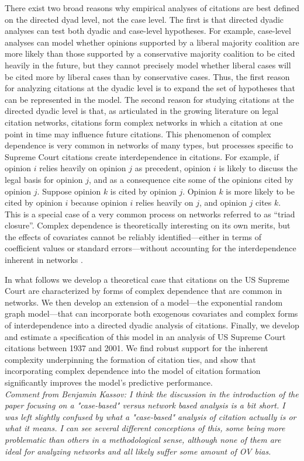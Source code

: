 \documentclass[headsepline=true, abstracton]{scrartcl}
\begin{document}
There exist two broad reasons why empirical analyses of citations are best defined on the directed dyad level, not the case level. The first is that directed dyadic analyses can test both dyadic and case-level hypotheses. For example, case-level analyses can model whether opinions supported by a liberal majority coalition are more likely than those supported by a conservative majority coalition to be cited heavily in the future, but they cannot precisely model whether liberal cases will be cited more by liberal cases than by conservative cases. Thus, the first reason for analyzing citations at the dyadic level is to expand the set of hypotheses that can be represented in the model. The second reason for studying citations at the directed dyadic level is that, as articulated in the growing literature on legal citation networks, citations form complex networks in which a citation at one point in time may influence future citations. This phenomenon of complex dependence is very common in networks of many types, but processes specific to Supreme Court citations create interdependence in citations. For example, if opinion $i$ relies heavily on opinion $j$ as precedent, opinion $i$ is likely to discuss the legal basis for opinion $j$, and as a consequence cite some of the opinions cited by opinion $j$. Suppose opinion $k$ is cited by opinion $j$. Opinion $k$ is more likely to be cited by opinion $i$ because opinion $i$ relies heavily on $j$, and opinion $j$ cites $k$.  This is a special case of a very common process on networks referred to as ``triad closure''. Complex dependence is theoretically interesting on its own merits, but the effects of covariates cannot be reliably identified---either in terms of coefficient values or standard errors---without accounting for the interdependence inherent in networks \citep{desmaraisstatistical}. 

In what follows we develop a theoretical case that citations on the US Supreme Court are characterized by forms of complex dependence that are common in networks. We then develop an extension of a model---the exponential random graph model---that can incorporate both exogenous covariates and complex forms of interdependence into a directed dyadic analysis of citations. Finally, we develop and estimate a specification of this model in an analysis of US Supreme Court citations between 1937 and 2001. We find robust support for the inherent complexity underpinning the formation of citation ties, and show that incorporating complex dependence into the model of citation formation significantly improves the model's predictive performance.\\[0.5cm]
\textit{Comment from Benjamin Kassov: I think the discussion in the introduction of the paper focusing on a "case-based" versus network based analysis is a bit short. 
I was left slightly confused by what a "case-based" analysis of citation actually is or what it means. 
I can see several different conceptions of this, some being more problematic than others in a methodological sense, 
although none of them are ideal for analyzing networks and all likely suffer some amount of OV bias.}
\end{document}
